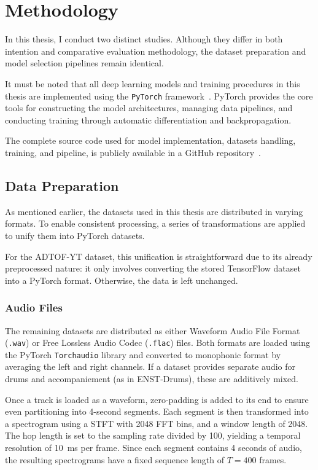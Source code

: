 \chapter{Methodology}\label{Methodology}

In this thesis, I conduct two distinct studies. Although they differ in both intention and comparative evaluation methodology, the dataset preparation and model selection pipelines remain identical.

It must be noted that all deep learning models and training procedures in this thesis are implemented using the \texttt{PyTorch} framework~\cite{paszke2019pytorch}. PyTorch provides the core tools for constructing the model architectures, managing data pipelines, and conducting training through automatic differentiation and backpropagation.

The complete source code used for model implementation, datasets handling, training, and pipeline, is publicly available in a GitHub repository~\cite{fosse2025}.

\section{Data Preparation}

As mentioned earlier, the datasets used in this thesis are distributed in varying formats. To enable consistent processing, a series of transformations are applied to unify them into PyTorch datasets.

For the ADTOF-YT dataset, this unification is straightforward due to its already preprocessed nature: it only involves converting the stored TensorFlow dataset into a PyTorch format. Otherwise, the data is left unchanged.

\subsection{Audio Files}

The remaining datasets are distributed as either Waveform Audio File Format (\texttt{.wav}) or Free Lossless Audio Codec (\texttt{.flac}) files. Both formats are loaded using the PyTorch \texttt{Torchaudio} library and converted to monophonic format by averaging the left and right channels. If a dataset provides separate audio for drums and accompaniement (as in ENST-Drums), these are additively mixed.

Once a track is loaded as a waveform, zero-padding is added to its end to ensure even partitioning into 4-second segments. Each segment is then transformed into a spectrogram using a \acrfull{STFT} with 2048 FFT bins, and a window length of 2048. The hop length is set to the sampling rate divided by 100, yielding a temporal resolution of 10~ms per frame. Since each segment contains 4 seconds of audio, the resulting spectrograms have a fixed sequence length of $T = 400$ frames.


